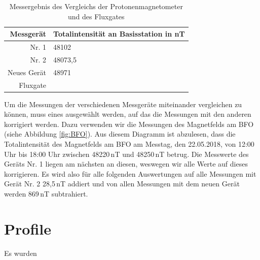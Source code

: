 \begin{table}[!ht]
 \centering
 \caption{Messergebnis des Vergleichs der Protonenmagnetometer und des Fluxgates}
 \begin{tabular}{rl}
 \toprule
 Messgerät & Totalintensität an Basisstation in nT \\
 \midrule
 Nr. 1 & 48102 \\
 Nr. 2 & 48073,5 \\
 Neues Gerät & 48971 \\
 Fluxgate &  \\
 \bottomrule
 \end{tabular}
\label{tab:VergleichErgebnis}
\end{table}

Um die Messungen der verschiedenen Messgeräte miteinander vergleichen zu können, muss eines ausgewählt werden, auf das die Messungen mit den anderen korrigiert werden. Dazu verwenden wir die Messungen des Magnetfelds am BFO (siehe Abbildung \ref{fig:BFO}). Aus diesem Diagramm ist abzulesen, dass die Totalintensität des Magnetfelds am BFO am Messtag, den 22.05.2018, von 12:00 Uhr bis 18:00 Uhr zwischen 48220\,nT und 48250\,nT betrug. Die Messwerte des Geräts Nr. 1 liegen am nächsten an diesen, weswegen wir alle Werte auf dieses korrigieren. Es wird also für alle folgenden Auswertungen auf alle Messungen mit Gerät Nr. 2  28,5\,nT addiert und von allen Messungen mit dem neuen Gerät werden 869\,nT subtrahiert.

\section{Profile}

Es wurden 


